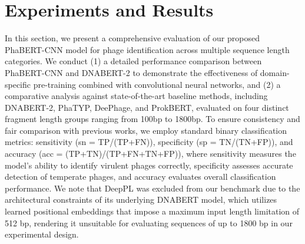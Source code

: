\documentclass[runningheads]{llncs}
\begin{document}
    
    


\section{Experiments and Results} \label{results}
In this section, we present a comprehensive evaluation of our proposed PhaBERT-CNN model for phage identification across multiple sequence length categories. We conduct (1) a detailed performance comparison between PhaBERT-CNN and DNABERT-2 to demonstrate the effectiveness of domain-specific pre-training combined with convolutional neural networks, and (2) a comparative analysis against state-of-the-art baseline methods, including DNABERT-2, PhaTYP, DeePhage, and ProkBERT, evaluated on four distinct fragment length groups ranging from 100bp to 1800bp. To ensure consistency and fair comparison with previous works, we employ standard binary classification metrics: sensitivity (sn = TP/(TP+FN)), specificity (sp = TN/(TN+FP)), and accuracy (acc = (TP+TN)/(TP+FN+TN+FP)), where sensitivity measures the model's ability to identify virulent phages correctly, specificity assesses accurate detection of temperate phages, and accuracy evaluates overall classification performance. We note that DeepPL was excluded from our benchmark due to the architectural constraints of its underlying DNABERT model, which utilizes learned positional embeddings that impose a maximum input length limitation of 512 bp, rendering it unsuitable for evaluating sequences of up to 1800 bp in our experimental design.
\end{document}
